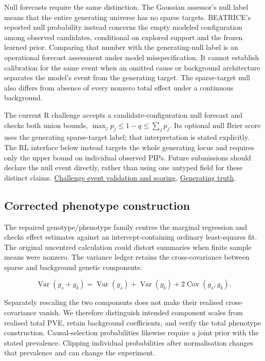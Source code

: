 \documentclass[
  british,
  10pt,
]{article}
\begin{document}
Null forecasts require the same distinction. The Gaussian assessor's
null label means that the entire generating universe has no sparse
targets. BEATRICE's reported null probability instead concerns the empty
modeled configuration among observed candidates, conditional on explored
support and the frozen learned prior. Comparing that number with the
generating-null label is an operational forecast assessment under model
misspecification. It cannot establish calibration for the same event
when an omitted cause or background architecture separates the model's
event from the generating target. The sparse-target null also differs
from absence of every nonzero total effect under a continuous
background.

The current R challenge accepts a candidate-configuration null forecast
and checks both union bounds, \(\max_jp_j\le1-q\le\sum_jp_j\). Its
optional null Brier score uses the generating sparse-target label; that
interpretation is stated explicitly. The RL interface below instead
targets the whole generating locus and requires only the upper bound on
individual observed PIPs. Future submissions should declare the null
event directly, rather than using one untyped field for these distinct
claims. \href{../R/challenge_evaluation.R}{Challenge event validation
and scoring}, \href{../R/challenge_simulation.R}{Generating truth}.

\subsection{Corrected phenotype
construction}\label{corrected-phenotype-construction}

The repaired genotype/phenotype family centres the marginal regression
and checks effect estimates against an intercept-containing ordinary
least-squares fit. The original uncentred calculation could distort
summaries when finite sample means were nonzero. The variance ledger
retains the cross-covariance between sparse and background genetic
components:

\[\operatorname{Var}(g_s+g_b)=\operatorname{Var}(g_s)+
\operatorname{Var}(g_b)+2\operatorname{Cov}(g_s,g_b).\]

Separately rescaling the two components does not make their realised
cross-covariance vanish. We therefore distinguish intended component
scales from realised total PVE, retain background coefficients, and
verify the total phenotype construction. Causal-selection probabilities
likewise require a joint prior with the stated prevalence. Clipping
individual probabilities after normalisation changes that prevalence and
can change the experiment.
\end{document}
